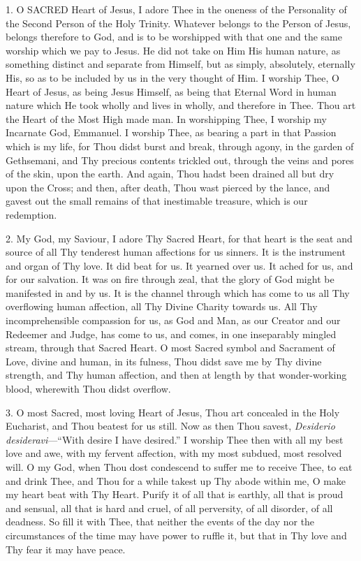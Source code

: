 
1. O SACRED
Heart of Jesus, I adore Thee in the oneness of the Personality of the
Second Person of the Holy Trinity. Whatever belongs to the Person of
Jesus, belongs therefore to God, and is to be worshipped with that one
and the same worship which we pay to Jesus. He did not take on Him His
human nature, as something distinct and separate from Himself, but as
simply, absolutely, eternally His, so as to be included by us in the
very thought of Him. I worship Thee, O Heart of Jesus, as being Jesus
Himself, as being that Eternal Word in human nature which He took wholly
and lives in wholly, and therefore in Thee. Thou art the Heart of the
Most High made man. In worshipping Thee, I worship my Incarnate God,
Emmanuel. I worship Thee, as bearing a part in that Passion which is my
life, for Thou didst burst and break, through agony, in the garden of
Gethsemani, and Thy precious contents trickled out, through the veins
and pores of the skin, upon the earth. And again, Thou hadst been
drained all but dry upon the Cross; and then, after death, Thou wast
pierced by the lance, and gavest out the small remains of that
inestimable treasure, which is our redemption.

2. My God, my Saviour, I adore
Thy Sacred Heart, for that heart is the seat and source of all Thy tenderest human affections for us sinners. It is the instrument and
organ of Thy love. It did beat for us. It yearned over us. It ached for
us, and for our salvation. It was on fire through zeal, that the glory
of God might be manifested in and by us. It is the channel through which
has come to us all Thy overflowing human affection, all Thy Divine
Charity towards us. All Thy incomprehensible compassion for us, as God
and Man, as our Creator and our Redeemer and Judge, has come to us, and
comes, in one inseparably mingled stream, through that Sacred Heart. O
most Sacred symbol and Sacrament of Love, divine and human, in its
fulness, Thou didst save me by Thy divine strength, and Thy human
affection, and then at length by that wonder-working blood, wherewith
Thou didst overflow.

3. O most Sacred, most loving
Heart of Jesus, Thou art concealed in the Holy Eucharist, and Thou
beatest for us still. Now as then Thou savest, \emph{Desiderio desideravi}—``With
desire I have desired.'' I worship Thee then with all my best love and
awe, with my fervent affection, with my most subdued, most resolved
will. O my God, when Thou dost condescend to suffer me to receive Thee,
to eat and drink Thee, and Thou for a while takest up Thy abode within
me, O make my heart beat with Thy Heart. Purify it of all that is
earthly, all that is proud and sensual, all that is hard and cruel, of
all perversity, of all disorder, of all deadness. So fill it with Thee,
that neither the events of the day nor the circumstances of the time may
have power to ruffle it, but that in Thy love and Thy fear it may have
peace.

